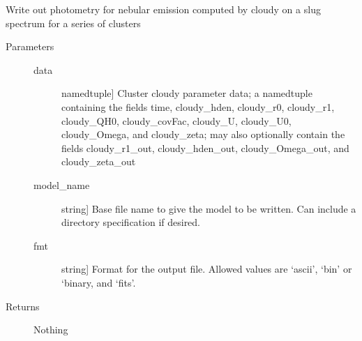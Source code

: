 \documentclass[letterpaper,10pt,english]{sphinxmanual}
\begin{document}

\begin{fulllineitems}
\label{cloudy:slugpy.cloudy.write_integrated_cloudyparams}
Write out photometry for nebular emission computed by cloudy on a
slug spectrum for a series of clusters
\begin{description}
\item[{Parameters}] \leavevmode\begin{description}
\item[{data}] \leavevmode{[}namedtuple{]}
Cluster cloudy parameter data; a namedtuple containing the
fields time, cloudy\_hden, cloudy\_r0, cloudy\_r1, 
cloudy\_QH0, cloudy\_covFac, cloudy\_U, cloudy\_U0, cloudy\_Omega, and
cloudy\_zeta; may also optionally contain the fields
cloudy\_r1\_out, cloudy\_hden\_out, cloudy\_Omega\_out, and
cloudy\_zeta\_out

\item[{model\_name}] \leavevmode{[}string{]}
Base file name to give the model to be written. Can include a
directory specification if desired.

\item[{fmt}] \leavevmode{[}string{]}
Format for the output file. Allowed values are `ascii', `bin'
or `binary, and `fits'.

\end{description}

\item[{Returns}] \leavevmode
Nothing

\end{description}

\end{fulllineitems}

\end{document}
